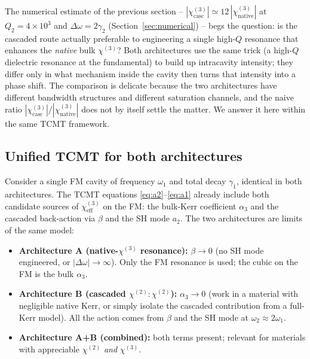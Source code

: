 \documentclass[11pt,a4paper]{article}
\newcommand{\chitwo}{\chi^{(2)}}
\newcommand{\chithree}{\chi^{(3)}}
\newcommand{\Dom}{\Delta\omega}
\begin{document}
The numerical estimate of the previous section -- $|\chithree_\text{casc}|
\simeq 12\,|\chithree_\text{native}|$ at $Q_2=4{\times}10^{3}$ and
$\Dom=2\gamma_2$ (Section~\ref{sec:numerical}) -- begs
the question: is the cascaded route actually preferable to engineering
a single high-$Q$ resonance that enhances the \emph{native} bulk
$\chithree$?  Both architectures use the same trick (a high-$Q$
dielectric resonance at the fundamental) to build up intracavity
intensity; they differ only in what mechanism inside the cavity then
turns that intensity into a phase shift.  The comparison is delicate
because the two architectures have different bandwidth structures and
different saturation channels, and the naive ratio
$|\chithree_\text{casc}|/|\chithree_\text{native}|$ does not by itself
settle the matter.  We answer it here within the same TCMT framework.

\subsection*{Unified TCMT for both architectures}

Consider a single FM cavity of frequency $\omega_1$ and total decay
$\gamma_1$, identical in both architectures.  The TCMT equations
\eqref{eq:a2}--\eqref{eq:a1} already include both candidate sources of
$\chithree_\text{eff}$ on the FM: the bulk-Kerr coefficient $\alpha_3$
and the cascaded back-action via $\beta$ and the SH mode $a_2$.  The
two architectures are limits of the same model:

\begin{itemize}\setlength{\itemsep}{3pt}
  \item \textbf{Architecture A (native-$\chithree$ resonance):}
        $\beta\to 0$ (no SH mode engineered, or $|\Dom|\!\to\!\infty$).
        Only the FM resonance is used; the cubic on the FM is the bulk
        $\alpha_3$.
  \item \textbf{Architecture B (cascaded $\chitwo{:}\chitwo$):}
        $\alpha_3\to 0$ (work in a material with negligible native
        Kerr, or simply isolate the cascaded contribution from a
        full-Kerr model).  All the action comes from $\beta$ and the
        SH mode at $\omega_2\approx 2\omega_1$.
  \item \textbf{Architecture A+B (combined):} both terms present;
        relevant for materials with appreciable $\chitwo$ \emph{and}
        $\chithree$.
\end{itemize}
\end{document}

